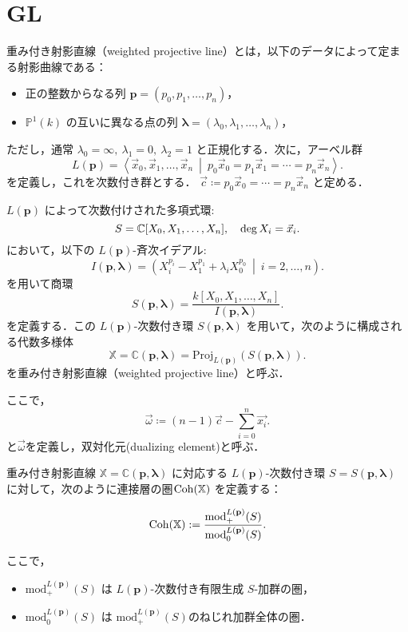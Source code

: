 \section{GL}
\begin{defn}\cite{GL87}
重み付き射影直線（weighted projective line）とは，以下のデータによって定まる射影曲線である：

\begin{itemize}
  \item 正の整数からなる列 $\mathbf{p} = (p_0, p_1, \dots, p_n)$，
  \item $\mathbb{P}^1(k)$ の互いに異なる点の列 $\boldsymbol{\lambda} = (\lambda_0, \lambda_1, \dots, \lambda_n)$，
\end{itemize}

ただし，通常 $\lambda_0 = \infty,\ \lambda_1 = 0,\ \lambda_2 = 1$ と正規化する．次に，アーベル群
\[
L(\mathbf{p}) = \left\langle \vec{x}_0, \vec{x}_1, \dots, \vec{x}_n \ \middle| \ p_0 \vec{x}_0 = p_1 \vec{x}_1 = \cdots = p_n \vec{x}_n \right\rangle .
\]
を定義し，これを次数付き群とする． $\vec{c}\coloneq p_0 \vec{x}_0 = \cdots = p_n \vec{x}_n$ と定める．

$L(\mathbf{p})$ によって次数付けされた多項式環:
\[
S = {\mathbb C}[X_0, X_1, \dots, X_n], \quad \deg X_i = \vec{x}_i.
\]
において，以下の $L(\mathbf{p})$-斉次イデアル:
\[
I(\mathbf{p}, \boldsymbol{\lambda}) = \left( X_i^{p_i} - X_1^{p_1} + \lambda_i X_0^{p_0} \ \middle|\ i = 2, \dots, n \right).
\]
を用いて商環
\[
S(\mathbf{p}, \boldsymbol{\lambda}) = \frac{k[X_0, X_1, \dots, X_n]}{I(\mathbf{p}, \boldsymbol{\lambda})}.
\]
を定義する．この $L(\mathbf{p})$-次数付き環 $S(\mathbf{p}, \boldsymbol{\lambda})$ を用いて，次のように構成される代数多様体
\[
\mathbb{X} = \mathbb{C}(\mathbf{p}, \boldsymbol{\lambda}) = \mathrm{Proj}_{L(\mathbf{p})}(S(\mathbf{p}, \boldsymbol{\lambda})).
\]
を重み付き射影直線（weighted projective line）と呼ぶ．
\end{defn}
ここで，
\[\vec{\omega} \coloneq (n-1)\vec{c} - \sum_{i=0}^n\vec{x_i}.\]
と$\vec{\omega}$を定義し，双対化元(dualizing element)と呼ぶ．

\begin{defn}\cite{GL87}
重み付き射影直線 $\mathbb{X} = \mathbb{C}(\mathbf{p}, \boldsymbol{\lambda})$ に対応する $L(\mathbf{p})$-次数付き環 $S = S(\mathbf{p}, \boldsymbol{\lambda})$ に対して，次のように連接層の圏$\operatorname{\mathrm{Coh}}(\mathbb{X})$ を定義する：

\[
\operatorname{\mathrm{Coh}}(\mathbb{X}) := \frac{\mathrm{mod}^{L(\mathbf{p})}_+(S)}{\mathrm{mod}^{L(\mathbf{p})}_0(S)}.
\]

ここで，
\begin{itemize}
  \item $\mathrm{mod}^{L(\mathbf{p})}_+(S)$ は $L(\mathbf{p})$-次数付き有限生成 $S$-加群の圏，
	\item $\mathrm{mod}^{L(\mathbf{p})}_0(S)$ は $\mathrm{mod}^{L(\mathbf{p})}_+(S)$のねじれ加群全体の圏．
\end{itemize}
\end{defn}

